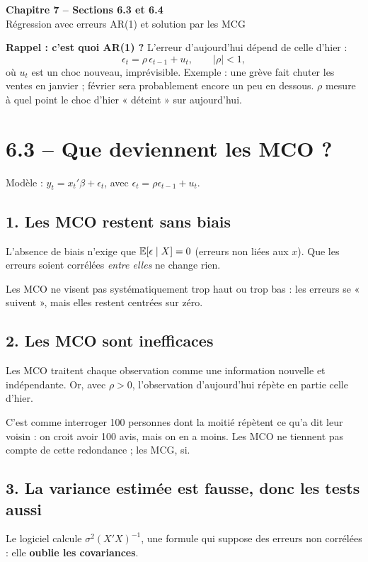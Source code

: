\documentclass[12pt,a4paper]{article}
\begin{document}
\begin{center}
{\LARGE\bfseries Chapitre 7 -- Sections 6.3 et 6.4}\\[4pt]
{\large Régression avec erreurs AR(1) et solution par les MCG}
\end{center}

\textbf{Rappel : c'est quoi AR(1) ?} L'erreur d'aujourd'hui dépend de celle d'hier :
\[
\epsilon_t=\rho\,\epsilon_{t-1}+u_t,\qquad |\rho|<1,
\]
où $u_t$ est un choc nouveau, imprévisible. Exemple : une grève fait chuter les ventes en janvier ; février sera probablement encore un peu en dessous. $\rho$ mesure à quel point le choc d'hier « déteint » sur aujourd'hui.

\section*{6.3 -- Que deviennent les MCO ?}

Modèle : $y_t=x_t'\beta+\epsilon_t$, avec $\epsilon_t=\rho\epsilon_{t-1}+u_t$.

\subsection*{1. Les MCO restent sans biais}
L'absence de biais n'exige que $\mathbb{E}[\epsilon\mid X]=0$ (erreurs non liées aux $x$). Que les erreurs soient corrélées \emph{entre elles} ne change rien.
\begin{intuition}
Les MCO ne visent pas systématiquement trop haut ou trop bas : les erreurs se « suivent », mais elles restent centrées sur zéro.
\end{intuition}

\subsection*{2. Les MCO sont inefficaces}
Les MCO traitent chaque observation comme une information nouvelle et indépendante. Or, avec $\rho>0$, l'observation d'aujourd'hui répète en partie celle d'hier.
\begin{intuition}
C'est comme interroger 100 personnes dont la moitié répètent ce qu'a dit leur voisin : on croit avoir 100 avis, mais on en a moins. Les MCO ne tiennent pas compte de cette redondance ; les MCG, si.
\end{intuition}

\subsection*{3. La variance estimée est fausse, donc les tests aussi}
Le logiciel calcule $\sigma^2(X'X)^{-1}$, une formule qui suppose des erreurs non corrélées : elle \textbf{oublie les covariances}.
\end{document}
